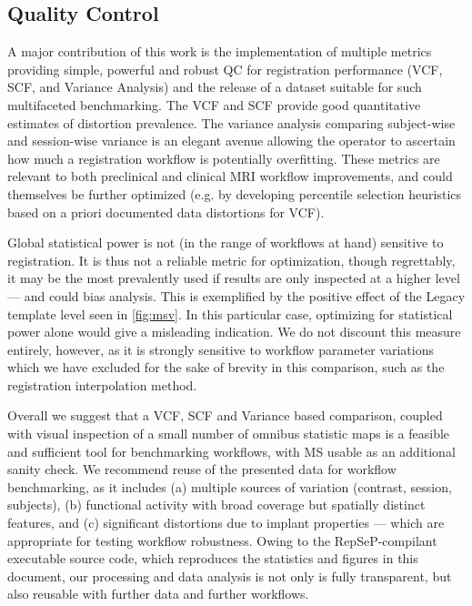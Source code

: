 \subsection{Quality Control}

A major contribution of this work is the implementation of multiple metrics providing simple, powerful and robust QC for registration performance (VCF, SCF, and Variance Analysis) and the release of a dataset suitable for such multifaceted benchmarking.
The VCF and SCF provide good quantitative estimates of distortion prevalence.
The variance analysis comparing subject-wise and session-wise variance is an elegant avenue allowing the operator to ascertain how much a registration workflow is potentially overfitting.
These metrics are relevant to both preclinical and clinical MRI workflow improvements, and could themselves be further optimized (e.g. by developing percentile selection heuristics based on a priori documented data distortions for VCF).

Global statistical power is not (in the range of workflows at hand) sensitive to registration.
It is thus not a reliable metric for optimization, though regrettably, it may be the most prevalently used if results are only inspected at a higher level --- and could bias analysis.
This is exemplified by the positive effect of the Legacy template level seen in \cref{fig:msv}.
In this particular case, optimizing for statistical power alone would give a misleading indication.
We do not discount this measure entirely, however, as it is strongly sensitive to workflow parameter variations which we have excluded for the sake of brevity in this comparison, such as the registration interpolation method.

Overall we suggest that a VCF, SCF and Variance based comparison, coupled with visual inspection of a small number of omnibus statistic maps is a feasible and sufficient tool for benchmarking workflows, with MS usable as an additional sanity check.
We recommend reuse of the presented data for workflow benchmarking, as it includes (a) multiple sources of variation (contrast, session, subjects), (b) functional activity with broad coverage but spatially distinct features, and (c) significant distortions due to implant properties --- which are appropriate for testing workflow robustness.
Owing to the RepSeP-compilant executable source code, which reproduces the statistics and figures in this document, our processing and data analysis is not only is fully transparent, but also reusable with further data and further workflows.

